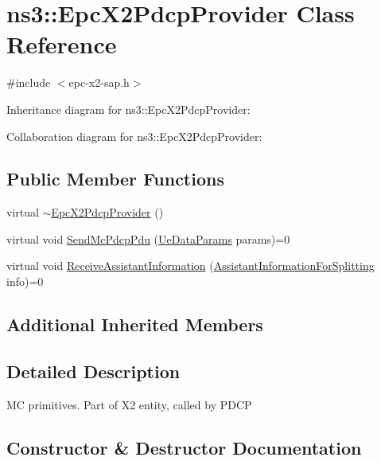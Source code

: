 \hypertarget{classns3_1_1EpcX2PdcpProvider}{}\section{ns3\+:\+:Epc\+X2\+Pdcp\+Provider Class Reference}
\label{classns3_1_1EpcX2PdcpProvider}


{\ttfamily \#include $<$epc-\/x2-\/sap.\+h$>$}



Inheritance diagram for ns3\+:\+:Epc\+X2\+Pdcp\+Provider\+:


Collaboration diagram for ns3\+:\+:Epc\+X2\+Pdcp\+Provider\+:
\subsection*{Public Member Functions}
\begin{DoxyCompactItemize}
\item 
virtual \hyperlink{classns3_1_1EpcX2PdcpProvider_a053e5cdb662179272eab6e112d04ef91}{$\sim$\+Epc\+X2\+Pdcp\+Provider} ()
\item 
virtual void \hyperlink{classns3_1_1EpcX2PdcpProvider_a3e7d70dc42d16cc0f76758439a9c5b57}{Send\+Mc\+Pdcp\+Pdu} (\hyperlink{structns3_1_1EpcX2Sap_1_1UeDataParams}{Ue\+Data\+Params} params)=0
\item 
virtual void \hyperlink{classns3_1_1EpcX2PdcpProvider_a5f2ae6db0777d561f429f20c5968dfb3}{Receive\+Assistant\+Information} (\hyperlink{structns3_1_1EpcX2Sap_1_1AssistantInformationForSplitting}{Assistant\+Information\+For\+Splitting} info)=0
\end{DoxyCompactItemize}
\subsection*{Additional Inherited Members}


\subsection{Detailed Description}
MC primitives. Part of X2 entity, called by P\+D\+CP 

\subsection{Constructor \& Destructor Documentation}
